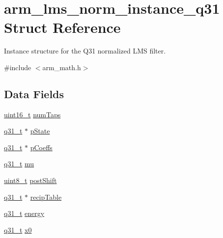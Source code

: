 \hypertarget{structarm__lms__norm__instance__q31}{\section{arm\-\_\-lms\-\_\-norm\-\_\-instance\-\_\-q31 Struct Reference}
\label{structarm__lms__norm__instance__q31}
}


Instance structure for the Q31 normalized L\-M\-S filter.  




{\ttfamily \#include $<$arm\-\_\-math.\-h$>$}

\subsection*{Data Fields}
\begin{DoxyCompactItemize}
\item 
\hyperlink{stdint_8h_a273cf69d639a59973b6019625df33e30}{uint16\-\_\-t} \hyperlink{structarm__lms__norm__instance__q31_a28e4c085af69c9c3e2e95dacf8004c3e}{num\-Taps}
\item 
\hyperlink{arm__math_8h_adc89a3547f5324b7b3b95adec3806bc0}{q31\-\_\-t} $\ast$ \hyperlink{structarm__lms__norm__instance__q31_a6b25c96cf048b77078d62f4252a01ec4}{p\-State}
\item 
\hyperlink{arm__math_8h_adc89a3547f5324b7b3b95adec3806bc0}{q31\-\_\-t} $\ast$ \hyperlink{structarm__lms__norm__instance__q31_a57a64c1ff102d033c1bd05043f1d9955}{p\-Coeffs}
\item 
\hyperlink{arm__math_8h_adc89a3547f5324b7b3b95adec3806bc0}{q31\-\_\-t} \hyperlink{structarm__lms__norm__instance__q31_ad3dd2a2406e02fdaa7782ba6c3940a64}{mu}
\item 
\hyperlink{stdint_8h_aba7bc1797add20fe3efdf37ced1182c5}{uint8\-\_\-t} \hyperlink{structarm__lms__norm__instance__q31_a28d7b9e437817f83397e081967e90f3c}{post\-Shift}
\item 
\hyperlink{arm__math_8h_adc89a3547f5324b7b3b95adec3806bc0}{q31\-\_\-t} $\ast$ \hyperlink{structarm__lms__norm__instance__q31_a85836d0907077b9ac660f7bbbaa9d694}{recip\-Table}
\item 
\hyperlink{arm__math_8h_adc89a3547f5324b7b3b95adec3806bc0}{q31\-\_\-t} \hyperlink{structarm__lms__norm__instance__q31_a3c0ae42869afec8555dc8e3a7ef9b386}{energy}
\item 
\hyperlink{arm__math_8h_adc89a3547f5324b7b3b95adec3806bc0}{q31\-\_\-t} \hyperlink{structarm__lms__norm__instance__q31_a47c4466d644e0d8ba407995adfa9b917}{x0}
\end{DoxyCompactItemize}


